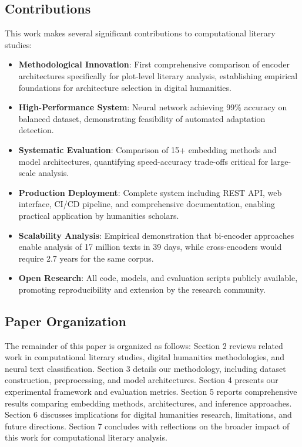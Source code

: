 \documentclass[12pt,a4paper]{article}
\begin{document}
\subsection{Contributions}

This work makes several significant contributions to computational literary studies:

\begin{itemize}
    \item \textbf{Methodological Innovation}: First comprehensive comparison of encoder architectures specifically for plot-level literary analysis, establishing empirical foundations for architecture selection in digital humanities.

    \item \textbf{High-Performance System}: Neural network achieving 99\% accuracy on balanced dataset, demonstrating feasibility of automated adaptation detection.

    \item \textbf{Systematic Evaluation}: Comparison of 15+ embedding methods and model architectures, quantifying speed-accuracy trade-offs critical for large-scale analysis.

    \item \textbf{Production Deployment}: Complete system including REST API, web interface, CI/CD pipeline, and comprehensive documentation, enabling practical application by humanities scholars.

    \item \textbf{Scalability Analysis}: Empirical demonstration that bi-encoder approaches enable analysis of 17 million texts in 39 days, while cross-encoders would require 2.7 years for the same corpus.

    \item \textbf{Open Research}: All code, models, and evaluation scripts publicly available, promoting reproducibility and extension by the research community.
\end{itemize}

\subsection{Paper Organization}

The remainder of this paper is organized as follows: Section 2 reviews related work in computational literary studies, digital humanities methodologies, and neural text classification. Section 3 details our methodology, including dataset construction, preprocessing, and model architectures. Section 4 presents our experimental framework and evaluation metrics. Section 5 reports comprehensive results comparing embedding methods, architectures, and inference approaches. Section 6 discusses implications for digital humanities research, limitations, and future directions. Section 7 concludes with reflections on the broader impact of this work for computational literary analysis.
\end{document}
